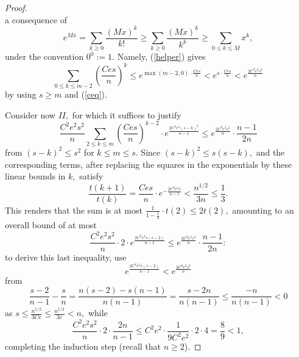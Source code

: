 \documentclass[10pt,a4paper]{amsart}
\begin{document}
\begin{proof}
\begin{equation}
    \end{equation}
    a consequence of
    \[e^{Mx}=\sum_{k \geq 0}{\frac{(Mx)^k}{k!}} \geq \sum_{k \geq 0}{\frac{(Mx)^k}{k^k}} \geq \sum_{0 \leq k \leq M}{x^k},\]
    under the convention \(0^0:=1.\) Namely, (\ref{helper}) gives
    \[\sum_{0 \leq k \leq m-2}{(\frac{Ces}{n})^{k}} \leq e^{\max{(m-2,0)} \cdot \frac{Ces}{n}}<e^{s \cdot \frac{Ces}{n}}< e^{\frac{2C^2e^2s^2}{n}}\]
    by using \(s \geq m\) and (\ref{ceq}). %
    \par
    Consider now \(II,\) for which it suffices to justify
    \[\frac{C^2e^2s^2}{n}\sum_{2 \leq k \leq m}{(\frac{Ces}{n})^{k-2} \cdot e^{\frac{2C^2e^2(s-k)^2}{n-1}}} \leq e^{\frac{2C^2e^2s^2}{n}} \cdot \frac{n-1}{2n}\]
    from \((s-k)^2 \leq s^2\) for \(k \leq m \leq s.\) Since \((s-k)^2 \leq s(s-k),\) and the corresponding terms, after replacing the squares in the exponentials by these linear bounds in \(k,\) satisfy
    \[\frac{t(k+1)}{t(k)}=\frac{Ces}{n} \cdot e^{-\frac{2C^2e^2s}{n-1}}< \frac{n^{1/2}}{3n} \leq \frac{1}{3}.\]
    This renders that the sum is at most \(\frac{1}{1-\frac{1}{3}} \cdot t(2) \leq 2t(2),\) amounting to an overall bound of at most
    \[\frac{C^2e^2s^2}{n} \cdot 2 \cdot e^{\frac{2C^2e^2s(s-2)}{n-1}} \leq e^{\frac{2C^2e^2s^2}{n}} \cdot \frac{n-1}{2n}:\]
    to derive this last inequality, use
    \[e^{\frac{2C^2e^2s(s-2)}{n-1}}< e^{\frac{2C^2e^2s^2}{n}}\]
    from 
    \[\frac{s-2}{n-1}-\frac{s}{n}=\frac{n(s-2)-s(n-1)}{n(n-1)}=\frac{s-2n}{n(n-1)} \leq \frac{-n}{n(n-1)}<0\] 
    as \(s \leq \frac{n^{1/2}}{3Ce} \leq \frac{n^{1/2}}{3e}<n,\) while 
    \[\frac{C^2e^2s^2}{n} \cdot 2 \cdot \frac{2n}{n-1} \leq C^2e^2 \cdot \frac{1}{9C^2e^2}\cdot 2 \cdot 4=\frac{8}{9}<1,\]
    completing the induction step (recall that \(n \geq 2\)).
    
\end{proof}
\end{document}
